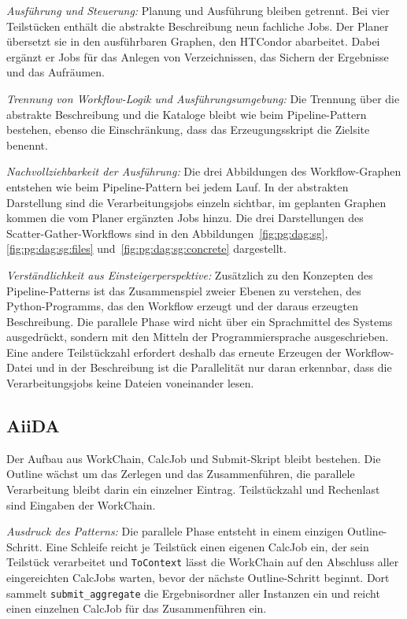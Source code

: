 \emph{Ausführung und Steuerung:} Planung und Ausführung bleiben
getrennt. Bei vier Teilstücken enthält die abstrakte Beschreibung
neun fachliche Jobs. Der Planer übersetzt sie in den ausführbaren Graphen, den HTCondor abarbeitet. Dabei ergänzt er Jobs für das Anlegen von Verzeichnissen, das Sichern der Ergebnisse und das Aufräumen.

\emph{Trennung von Workflow-Logik und Ausführungsumgebung:} Die
Trennung über die abstrakte Beschreibung und die Kataloge bleibt wie
beim Pipeline-Pattern bestehen, ebenso die Einschränkung, dass das
Erzeugungsskript die Zielsite benennt.


\emph{Nachvollziehbarkeit der Ausführung:} Die drei Abbildungen des
Workflow-Graphen entstehen wie beim Pipeline-Pattern bei jedem Lauf.
In der abstrakten Darstellung sind die Verarbeitungsjobs einzeln
sichtbar, im geplanten Graphen kommen die vom Planer ergänzten Jobs
hinzu. Die drei Darstellungen des Scatter-Gather-Workflows sind in
den Abbildungen~\ref{fig:pg:dag:sg}, \ref{fig:pg:dag:sg:files}
und~\ref{fig:pg:dag:sg:concrete} dargestellt.

\emph{Verständlichkeit aus Einsteigerperspektive:} Zusätzlich zu den
Konzepten des Pipeline-Patterns ist das Zusammenspiel zweier Ebenen
zu verstehen, des Python-Programms, das den Workflow erzeugt und
der daraus erzeugten Beschreibung. Die parallele Phase wird nicht
über ein Sprachmittel des Systems ausgedrückt, sondern mit den
Mitteln der Programmiersprache ausgeschrieben. Eine andere
Teilstückzahl erfordert deshalb das erneute Erzeugen der
Workflow-Datei und in der Beschreibung ist die Parallelität nur
daran erkennbar, dass die Verarbeitungsjobs keine Dateien
voneinander lesen.

\subsection{AiiDA}
\label{sec:lokal:sg:aiida}

Der Aufbau aus WorkChain, CalcJob und Submit-Skript bleibt bestehen.
Die Outline wächst um das Zerlegen und das Zusammenführen, die
parallele Verarbeitung bleibt darin ein einzelner Eintrag.
Teilstückzahl und Rechenlast sind Eingaben der WorkChain.

\emph{Ausdruck des Patterns:} Die parallele Phase entsteht in einem
einzigen Outline-Schritt. Eine Schleife reicht je Teilstück einen
eigenen CalcJob ein, der sein Teilstück verarbeitet und
\texttt{ToContext} lässt die WorkChain auf den Abschluss aller
eingereichten CalcJobs warten, bevor der nächste Outline-Schritt
beginnt. Dort sammelt \texttt{submit\_aggregate} die Ergebnisordner
aller Instanzen ein und reicht einen einzelnen CalcJob für das
Zusammenführen ein.

